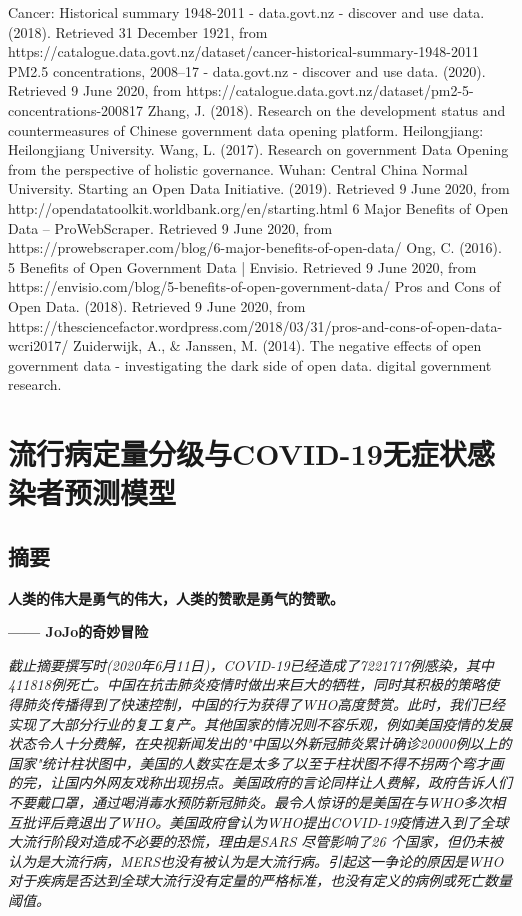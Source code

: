\documentclass[a4paper, 11pt,twoside=true,UTF8]{scrartcl}
\begin{document}
\newpage
\begin{thebibliography}{99}
	Cancer: Historical summary 1948-2011 - data.govt.nz - discover and use data. (2018). Retrieved 31 December 1921, from https://catalogue.data.govt.nz/dataset/cancer-historical-summary-1948-2011
	PM2.5 concentrations, 2008–17 - data.govt.nz - discover and use data. (2020). Retrieved 9 June 2020, from https://catalogue.data.govt.nz/dataset/pm2-5-concentrations-200817
	Zhang, J. (2018). Research on the development status and countermeasures of Chinese government data opening platform. Heilongjiang: Heilongjiang University.
	Wang, L. (2017). Research on government Data Opening from the perspective of holistic governance. Wuhan: Central China Normal University.
	Starting an Open Data Initiative. (2019). Retrieved 9 June 2020, from http://opendatatoolkit.worldbank.org/en/starting.html
	6 Major Benefits of Open Data – ProWebScraper. Retrieved 9 June 2020, from https://prowebscraper.com/blog/6-major-benefits-of-open-data/
	Ong, C. (2016). 5 Benefits of Open Government Data | Envisio. Retrieved 9 June 2020, from https://envisio.com/blog/5-benefits-of-open-government-data/
	Pros and Cons of Open Data. (2018). Retrieved 9 June 2020, from https://thesciencefactor.wordpress.com/2018/03/31/pros-and-cons-of-open-data-wcri2017/
	Zuiderwijk, A., \& Janssen, M. (2014). The negative effects of open government data - investigating the dark side of open data. digital government research.
\end{thebibliography}

\newpage

\section{流行病定量分级与COVID-19无症状感染者预测模型}
\subsection*{摘要}
\textbf{人类的伟大是勇气的伟大，人类的赞歌是勇气的赞歌。}
\begin{flushright}\textbf{—— JoJo的奇妙冒险}\end{flushright}
\vspace{0.7cm}

\textit{截止摘要撰写时(2020年6月11日)，COVID-19已经造成了7221717例感染，其中411818例死亡。中国在抗击肺炎疫情时做出来巨大的牺牲，同时其积极的策略使得肺炎传播得到了快速控制，中国的行为获得了WHO高度赞赏。此时，我们已经实现了大部分行业的复工复产。其他国家的情况则不容乐观，例如美国疫情的发展状态令人十分费解，在央视新闻发出的"中国以外新冠肺炎累计确诊20000例以上的国家"统计柱状图中，美国的人数实在是太多了以至于柱状图不得不拐两个弯才画的完，让国内外网友戏称出现拐点。美国政府的言论同样让人费解，政府告诉人们不要戴口罩，通过喝消毒水预防新冠肺炎。最令人惊讶的是美国在与WHO多次相互批评后竟退出了WHO。美国政府曾认为WHO提出COVID-19疫情进入到了全球大流行阶段对造成不必要的恐慌，理由是SARS 尽管影响了26 个国家，但仍未被认为是大流行病，MERS也没有被认为是大流行病。引起这一争论的原因是WHO对于疾病是否达到全球大流行没有定量的严格标准，也没有定义的病例或死亡数量阈值。}
\end{document}
